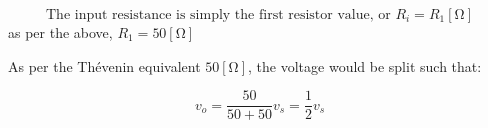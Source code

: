 \begin{enumerate}
    \begin{center}
      $$\boxed{\text{The input resistance is simply the first resistor value, or }R_i=R_1[\si{\ohm}]}$$ as per the above, $R_1=50[\si{\ohm}]$
    \end{center}

    \begin{center}
      As per the Th\'evenin equivalent $50[\si{\ohm}]$, the voltage would be split such that:
    \end{center}
    $$\boxed{v_o=\frac{50}{50+50}v_s=\frac{1}{2}v_s}$$

\end{enumerate}



